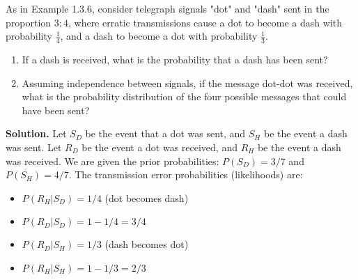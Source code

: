 \begin{problembox}
As in Example 1.3.6, consider telegraph signals "dot" and "dash" sent in the proportion $3:4$, where erratic transmissions cause a dot to become a dash with probability $\frac{1}{4}$, and a dash to become a dot with probability $\frac{1}{3}$.
\begin{enumerate}[label=(\alph*)]
    \item If a dash is received, what is the probability that a dash has been sent?
    \item Assuming independence between signals, if the message dot-dot was received, what is the probability distribution of the four possible messages that could have been sent?
\end{enumerate}
\end{problembox}

\noindent\textbf{Solution.}
Let $S_D$ be the event that a dot was sent, and $S_H$ be the event a dash was sent.
Let $R_D$ be the event a dot was received, and $R_H$ be the event a dash was received.
We are given the prior probabilities: $P(S_D) = 3/7$ and $P(S_H) = 4/7$.
The transmission error probabilities (likelihoods) are:
\begin{itemize}
    \item $P(R_H|S_D) = 1/4$ (dot becomes dash)
    \item $P(R_D|S_D) = 1 - 1/4 = 3/4$
    \item $P(R_D|S_H) = 1/3$ (dash becomes dot)
    \item $P(R_H|S_H) = 1 - 1/3 = 2/3$
\end{itemize}

